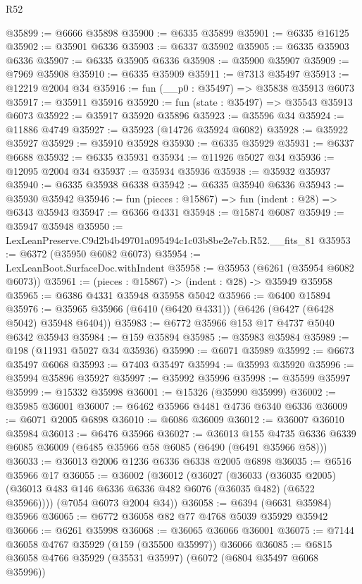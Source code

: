 \begin{lexlean}{R52}
\begin{coremodule}
@35899 := @6666 @35898
@35900 := @6335 @35899
@35901 := @6335 @16125
@35902 := @35901 @6336
@35903 := @6337 @35902
@35905 := @6335 @35903 @6336
@35907 := @6335 @35905 @6336
@35908 := @35900 @35907
@35909 := @7969 @35908
@35910 := @6335 @35909
@35911 := @7313 @35497
@35913 := @12219 @2004 @34
@35916 := fun (__p0 : @35497) => @35838 @35913 @6073
@35917 := @35911 @35916
@35920 := fun (state : @35497) => @35543 @35913 @6073
@35922 := @35917 @35920 @35896
@35923 := @35596 @34
@35924 := @11886 @4749
@35927 := @35923 (@14726 @35924 @6082)
@35928 := @35922 @35927
@35929 := @35910 @35928
@35930 := @6335 @35929
@35931 := @6337 @6688
@35932 := @6335 @35931
@35934 := @11926 @5027 @34
@35936 := @12095 @2004 @34
@35937 := @35934 @35936
@35938 := @35932 @35937
@35940 := @6335 @35938 @6338
@35942 := @6335 @35940 @6336
@35943 := @35930 @35942
@35946 := fun (pieces : @15867) => fun (indent : @28) => @6343 @35943
@35947 := @6366 @4331
@35948 := @15874 @6087
@35949 := @35947 @35948
@35950 := LexLeanPreserve.C9d2b4b49701a095494c1c03b8be2e7cb.R52.__fits_81
@35953 := @6372 (@35950 @6082 @6073)
@35954 := LexLeanBoot.SurfaceDoc.withIndent
@35958 := @35953 (@6261 (@35954 @6082 @6073))
@35961 := (pieces : @15867) -> (indent : @28) -> @35949 @35958
@35965 := @6386 @4331 @35948 @35958 @5042
@35966 := @6400 @15894
@35976 := @35965 @35966 (@6410 (@6420 @4331)) (@6426 (@6427 (@6428 @5042) @35948 @6404))
@35983 := @6772 @35966 @153 @17 @4737 @5040 @6342 @35943
@35984 := @159 @35894
@35985 := @35983 @35984
@35989 := @198 (@11931 @5027 @34 @35936)
@35990 := @6071 @35989
@35992 := @6673 @35497 @6068
@35993 := @7403 @35497
@35994 := @35993 @35920
@35996 := @35994 @35896 @35927
@35997 := @35992 @35996
@35998 := @35599 @35997
@35999 := @15332 @35998
@36001 := @15326 (@35990 @35999)
@36002 := @35985 @36001
@36007 := @6462 @35966 @4481 @4736 @6340 @6336
@36009 := @6071 @2005 @6898
@36010 := @6086 @36009
@36012 := @36007 @36010 @35984
@36013 := @6476 @35966
@36027 := @36013
    @155
    @4735
    @6336
    @6339
    @6085
    @36009
    (@6485 @35966 @58 @6085 (@6490 (@6491 @35966 @58)))
@36033 := @36013 @2006 @1236 @6336 @6338 @2005 @6898
@36035 := @6516 @35966 @17
@36055 := @36002
    (@36012
      (@36027
        (@36033
          (@36035 @2005)
          (@36013 @483 @146 @6336 @6336 @482 @6076 (@36035 @482) (@6522 @35966))))
      (@7054 @6073 @2004 @34))
@36058 := @6394 (@6631 @35984) @35966
@36065 := @6772 @36058 @82 @77 @4768 @5039 @35929 @35942
@36066 := @6261 @35998
@36068 := @36065 @36066 @36001
@36075 := @7144 @36058 @4767 @35929 (@159 (@35500 @35997)) @36066
@36085 := @6815 @36058 @4766 @35929 (@35531 @35997) (@6072 (@6804 @35497 @6068 @35996))

\end{coremodule}
\end{lexlean}
